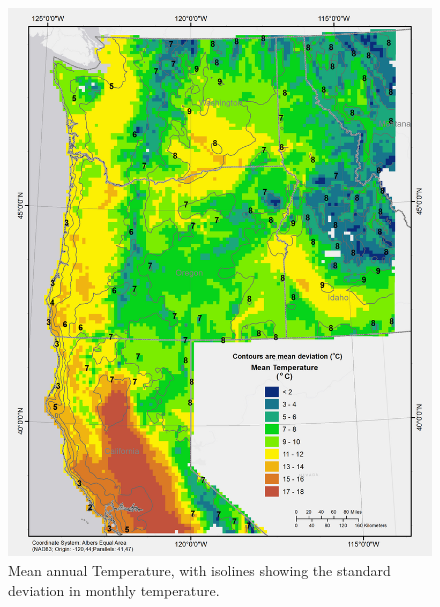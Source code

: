 \documentclass[preprint,12pt]{elsarticle}
\begin{document}
\begin{figure}[hp]
  \centering  
  \includegraphics[width=1\linewidth]{temp}  
\caption{Mean annual Temperature, with isolines showing the standard deviation in monthly temperature.}
  \label{fig:temp}
\end{figure}
\end{document}
